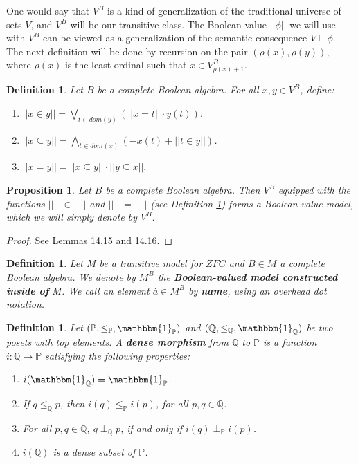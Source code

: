\documentclass[10pt,longbibliography]{article}
\newtheorem{Def}[Theo]{Definition}
\newtheorem{Prop}[Theo]{Proposition}
\newcommand{\One}{\mathbbm{1}}
\newcommand{\Po}{\mathbb{P}}
\newcommand{\Qo}{\mathbb{Q}}
\begin{document}
One would say that $V^B$ is a kind of generalization of the traditional universe of sets $V$, and $V^B$ will be our transitive class. The Boolean value $||\phi||$ we will use with $V^B$ can be viewed as a generalization of the semantic consequence $V \models \phi$. The next definition will be done by recursion on the pair $(\rho(x),\rho(y))$, where $\rho(x)$ is the least ordinal such that $x \in V^{B}_{\rho(x) + 1}.$

\begin{Def}\label{BooleanValuesForV^B}
	Let $B$ be a complete Boolean algebra. For all $x,y \in V^B$, define:
	\begin{enumerate}
		\item $||x \in y|| = \underset{t \in dom(y)}{\bigvee}(||x=t||\cdot y(t)).$  
		\item $||x \subseteq y|| = \underset{t \in dom(x)}{\bigwedge}(-x(t) + ||t \in y||)$.
		\item $||x=y|| = ||x \subseteq y|| \cdot ||y \subseteq x||.$
	\end{enumerate}   
\end{Def}

\begin{Prop}
	
	Let $B$ be a complete Boolean algebra. Then $V^B$ equipped with the functions $||- \in - ||$ and $|| - = - ||$ (see Definition \ref{BooleanValuesForV^B}) forms a Boolean value model, which we will simply denote by $V^B$.
	
\end{Prop}
\begin{proof}
	See \cite{Jech03} Lemmas 14.15 and 14.16.
\end{proof}

\begin{Def}\label{M^Bdef}
	Let $M$ be a transitive model for $ZFC$ and $B \in M$ a complete Boolean algebra. We denote by $M^{B}$ the \textbf{Boolean-valued model constructed inside of} $M$. We call an element $\overset{.}{a} \in M^{B}$ by \textbf{name}, using an overhead dot notation.
\end{Def}

\begin{Def}\label{densemorphism}
	Let $(\Po,\leq_{\Po},\One_{\Po})$ and $(\Qo,\leq_{\Qo},\One_{\Qo})$ be two posets with top elements. A \textbf{dense morphism} from $\Qo$ to $\Po$ is a  function  $i: \Qo \to \Po$ satisfying the following properties:
	\begin{enumerate}
		\item $i(\One_{\Qo}) = \One_{\Po}$.
		\item If $q \leq_{\Qo} p$, then $i(q)\leq_{\Po} i(p)$, for all $p, q \in \Qo$.
		\item For all $p,q \in \Qo$, $q \perp_{\Qo} p$, if and only if $i(q) \perp_{\Po} i(p)$.
		\item $i(\Qo)$ is a dense subset of $\Po$.
	\end{enumerate}
\end{Def}
\end{document}
